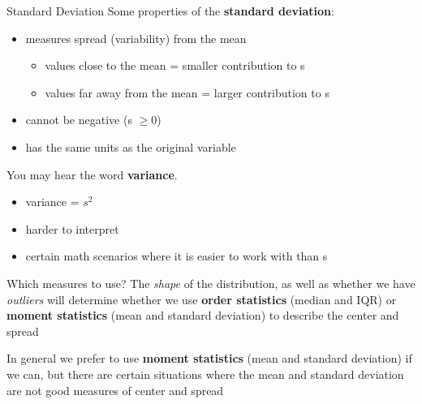 \documentclass{beamer}
\begin{document}
\begin{frame}{Standard Deviation}
Some properties of the \textbf{standard deviation}:
\begin{itemize}
    \item measures spread (variability) from the mean
    \begin{itemize}
        \item values close to the mean = smaller contribution to s
        \item values far away from the mean = larger contribution to s
    \end{itemize}
    \item cannot be negative (s $\geq 0$)
    \item has the same units as the original variable
\end{itemize}\vspace{8mm}

You may hear the word \textbf{variance}.
\begin{itemize}
    \item variance = $s^2$
    \item harder to interpret
    \item certain math scenarios where it is easier to work with than s
\end{itemize}
\end{frame}



\begin{frame}{Which measures to use?}
The \textit{shape} of the distribution, as well as whether we have \textit{outliers} will determine whether we use \textbf{order statistics} (median and IQR) or \textbf{moment statistics} (mean and standard deviation) to describe the center and spread \vspace{6mm}

In general we prefer to use \textbf{moment statistics} (mean and standard deviation) if we can, but there are certain situations where the mean and standard deviation are not good measures of center and spread
\end{frame}
\end{document}
